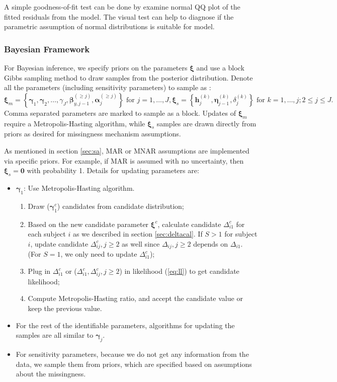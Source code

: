 \documentclass[12pt]{article}
\begin{document}
A simple goodness-of-fit test can be done by examine  normal
QQ plot of the fitted residuals from the model. The visual test can
help to diagnose if the parametric assumption of normal distributions
is suitable for model.

\subsubsection{Bayesian Framework}
\label{sec:bayesian}

For Bayesian inference, we specify priors on the parameters $\bm
\xi$ and use a block Gibbs sampling method to draw samples from the
posterior distribution. Denote all the parameters (including
sensitivity parameters) to sample as :
\begin{displaymath}
  \bm \xi_m = \left\{ \bm \gamma_1, \bm \gamma_2, \ldots, \gamma_J,
    \bm \beta_{y,j-1}^{(\geq j)}, \bm \alpha_j^{(\geq j)} \right\}
  \text{ for } j = 1, \ldots, J ,
  \bm \xi_s = \left\{ \bm h_j^{(k)}, \bm \eta_{j-1}^{(k)},  \delta_j^{(k)}
  \right\}
  \text{ for } k = 1, \ldots, j; 2 \leq j \leq J.
\end{displaymath}
Comma separated parameters are marked to sample as a block.  Updates
of $\bm \xi_m$ require a Metropolis-Hasting algorithm, while $\bm \xi_s$
samples are drawn directly from priors as desired for missingness
mechanism assumptions.

As mentioned in section \ref{sec:sa}, MAR or MNAR assumptions are
implemented via specific priors. For example, if MAR is assumed with
no uncertainty, then $ \bm \xi _s= \bm 0$ with probability 1. Details
for updating parameters are:

\begin{itemize}
\item $\bm \gamma_{1} $: Use Metropolis-Hasting algorithm.
  \begin{enumerate}
  \item Draw ($\bm \gamma_{1}^c$) candidates from candidate
    distribution;
  \item Based on the new candidate parameter $\bm \xi^c$, calculate
    candidate $\Delta_{i1}^c$ for each subject $i$ as we described in
    section \ref{sec:deltacal}. If $S > 1$ for subject $i$, update
    candidate $\Delta_{ij}^c, j \geq 2$ as well since $\Delta_{ij}, j
    \geq 2$ depends on $\Delta_{i1}$. (For $S = 1$, we only need to
    update $\Delta_{i1}^c$);
  \item Plug in $\Delta_{i1}^c$ or ($\Delta_{i1}^c, \Delta_{ij}^c, j
    \geq 2$) in likelihood (\ref{eq:ll}) to get candidate likelihood;
  \item Compute Metropolis-Hasting ratio, and accept the candidate
    value or keep the previous value.
  \end{enumerate}
\item For the rest of the identifiable parameters, algorithms for
  updating the samples are all similar to $\bm \gamma_j$.
\item For sensitivity parameters, because we do not get any
  information from the data, we sample them from priors, which are
  specified based on assumptions about the missingness.
\end{itemize}
\end{document}
